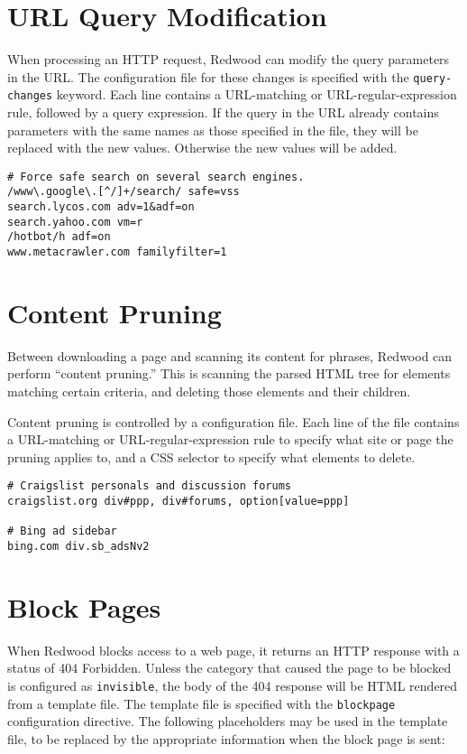 \documentclass{article}
\begin{document}
\section{URL Query Modification}

When processing an HTTP request, Redwood can modify the query parameters in the URL.
The configuration file for these changes is specified with the \verb"query-changes" keyword.
Each line contains a URL-matching or URL-regular-expression rule, 
followed by a query expression.
If the query in the URL already contains parameters with the same names as those specified in the file,
they will be replaced with the new values. Otherwise the new values will be added.

\begin{verbatim}
# Force safe search on several search engines.
/www\.google\.[^/]+/search/ safe=vss
search.lycos.com adv=1&adf=on
search.yahoo.com vm=r
/hotbot/h adf=on
www.metacrawler.com familyfilter=1
\end{verbatim}

\section{Content Pruning}

Between downloading a page and scanning its content for phrases, 
Redwood can perform ``content pruning.'' 
This is scanning the parsed HTML tree for elements matching certain criteria,
and deleting those elements and their children.

Content pruning is controlled by a configuration file.
Each line of the file contains a URL-matching or URL-regular-expression rule
to specify what site or page the pruning applies to, 
and a CSS selector to specify what elements to delete.

\begin{verbatim}
# Craigslist personals and discussion forums
craigslist.org div#ppp, div#forums, option[value=ppp]

# Bing ad sidebar
bing.com div.sb_adsNv2
\end{verbatim}

\section{Block Pages}

When Redwood blocks access to a web page, 
it returns an HTTP response with a status of 404 Forbidden.
Unless the category that caused the page to be blocked is configured as \verb"invisible",
the body of the 404 response will be HTML rendered from a template file.
The template file is specified with the \verb"blockpage" configuration directive.
The following placeholders may be used in the template file, 
to be replaced by the appropriate information when the block page is sent:
\end{document}
